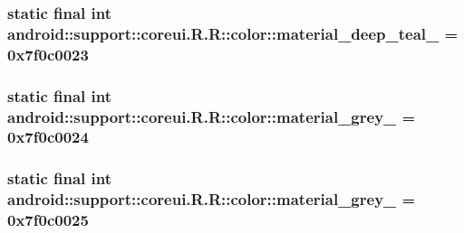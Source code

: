 \hypertarget{classandroid_1_1support_1_1coreui_1_1_r_1_1color_2906450c1ff1e04dc46a085f675d6156}{
\subsubsection[{material\_\-deep\_\-teal\_\-500}]{\setlength{\rightskip}{0pt plus 5cm}static final int android::support::coreui.R.R::color::material\_\-deep\_\-teal\_ = 0x7f0c0023}}
\label{classandroid_1_1support_1_1coreui_1_1_r_1_1color_2906450c1ff1e04dc46a085f675d6156}


\hypertarget{classandroid_1_1support_1_1coreui_1_1_r_1_1color_bfc0524f466315646e6ea0d39dd06efd}{
\subsubsection[{material\_\-grey\_\-100}]{\setlength{\rightskip}{0pt plus 5cm}static final int android::support::coreui.R.R::color::material\_\-grey\_ = 0x7f0c0024}}
\label{classandroid_1_1support_1_1coreui_1_1_r_1_1color_bfc0524f466315646e6ea0d39dd06efd}


\hypertarget{classandroid_1_1support_1_1coreui_1_1_r_1_1color_7c1aeb259169a415a9a76f37c8920df3}{
\subsubsection[{material\_\-grey\_\-300}]{\setlength{\rightskip}{0pt plus 5cm}static final int android::support::coreui.R.R::color::material\_\-grey\_ = 0x7f0c0025}}
\label{classandroid_1_1support_1_1coreui_1_1_r_1_1color_7c1aeb259169a415a9a76f37c8920df3}


